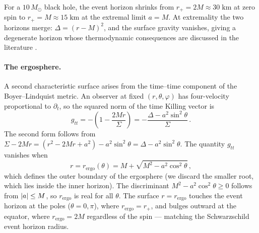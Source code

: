 For a $10\,M_\odot$ black hole, the event horizon shrinks from
$r_+ = 2M \approx 30\;\text{km}$ at zero spin to
$r_+ = M \approx 15\;\text{km}$ at the extremal limit $a = M$.
At extremality the two horizons merge:
$\Delta = (r - M)^2$, and the surface gravity vanishes,
giving a degenerate horizon whose thermodynamic
consequences are discussed in the literature
\cite{Bardeen1972}.

\paragraph{The ergosphere.}

A second characteristic surface arises from the time--time component
of the Boyer--Lindquist metric.  An observer at fixed
$(r, \theta, \varphi)$ has four-velocity proportional to
$\partial_t$, so the squared norm of the time Killing vector is
%
\begin{equation}
  g_{tt} = -\!\left(1 - \frac{2Mr}{\Sigma}\right)
         = -\frac{\Delta - a^2\sin^2\!\theta}{\Sigma} \,.
  \label{eq:kerr-gtt}
\end{equation}
%
The second form follows from
$\Sigma - 2Mr = (r^2 - 2Mr + a^2) - a^2\sin^2\!\theta
= \Delta - a^2\sin^2\!\theta$.
The quantity $g_{tt}$ vanishes when
%
\begin{equation}
  r = r_{\text{ergo}}(\theta) = M + \sqrt{M^2 - a^2\cos^2\!\theta} \,,
  \label{eq:kerr-ergosphere}
\end{equation}
%
which defines the outer boundary of the ergosphere (we discard the
smaller root, which lies inside the inner horizon).  The
discriminant $M^2 - a^2\cos^2\!\theta \geq 0$ follows from
$\left\lvert a \right\rvert \leq M$, so $r_{\text{ergo}}$ is real for all
$\theta$.  The surface $r = r_{\text{ergo}}$ touches the event
horizon at the poles ($\theta = 0, \pi$), where
$r_{\text{ergo}} = r_+$, and bulges outward at the equator, where
$r_{\text{ergo}} = 2M$ regardless of the spin --- matching the
Schwarzschild event horizon radius.

